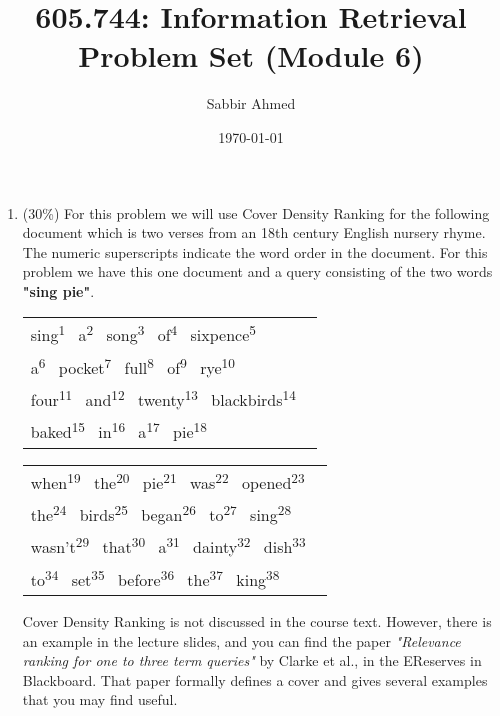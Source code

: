 \documentclass[11pt]{article}
\title{605.744: Information Retrieval \\ Problem Set (Module 6)}
\author{Sabbir Ahmed}
\date{\today}
\newcommand{\super}{\textsuperscript}
\begin{document}
\maketitle

    \begin{enumerate}
        \item (30\%) For this problem we will use Cover Density Ranking for the following document which is two verses from an 18th century English nursery rhyme. The numeric superscripts indicate the word order in the document. For this problem we have this one document and a query consisting of the two words \textbf{"sing pie"}.

        \begin{center}
            \begin{tabular}{l}
            sing\super{1} \ a\super{2} \ song\super{3} \ of\super{4} \ sixpence\super{5} \ \\
            a\super{6} \ pocket\super{7} \ full\super{8} \ of\super{9} \ rye\super{10} \ \\
            four\super{11} \ and\super{12} \ twenty\super{13} \ blackbirds\super{14} \ \\
            baked\super{15} \ in\super{16} \ a\super{17} \ pie\super{18}
            \end{tabular}
        \end{center}

        \begin{center}
            \begin{tabular}{l}
            when\super{19} \ the\super{20} \ pie\super{21} \ was\super{22} \ opened\super{23} \ \\
            the\super{24} \ birds\super{25} \ began\super{26} \ to\super{27} \ sing\super{28} \ \\
            wasn't\super{29} \ that\super{30} \ a\super{31} \ dainty\super{32} \ dish\super{33} \ \\
            to\super{34} \ set\super{35} \ before\super{36} \ the\super{37} \ king\super{38}
            \end{tabular}
        \end{center}

        Cover Density Ranking is not discussed in the course text. However, there is an example in the lecture slides, and you can find the paper \textit{"Relevance ranking for one to three term queries"} by Clarke et al., in the EReserves in Blackboard. That paper formally defines a cover and gives several examples that you may find useful.


\end{enumerate}
\end{document}

